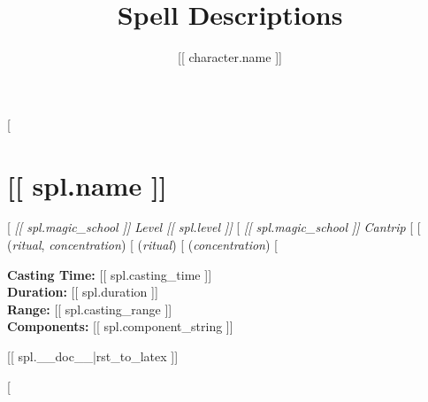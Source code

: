 \documentclass[twocolumn,lettersize]{article}
\title{Spell Descriptions}
\author{[[ character.name ]]}
\date{}
\begin{document}
\maketitle

[%

  \section*{[[ spl.name ]]}

  [%
    \textit{[[ spl.magic_school ]] Level [[ spl.level ]]} %
  [%
    \textit{[[ spl.magic_school ]] Cantrip} %
  [%
  [%
    (\textit{ritual}, \textit{concentration})%
  [%
    (\textit{ritual})%
  [%
    (\textit{concentration})%
  [%
             
  \noindent
  \textbf{Casting Time:} [[ spl.casting_time ]] \\
  \textbf{Duration:} [[ spl.duration ]]\\
  \textbf{Range:} [[ spl.casting_range ]] \\
  \textbf{Components:} [[ spl.component_string ]] 

  [[ spl.__doc__|rst_to_latex ]]

[%
\end{document}
